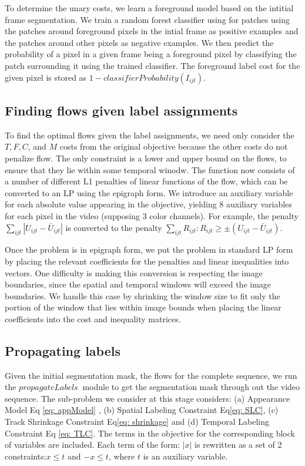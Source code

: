 To determine the unary costs, we learn a foreground model based on
the intitial frame segmentation. We train a random forest classifier
using for patches using the patches around foreground pixels in the
intial frame as positive examples and the patches around other pixels
as negative examples. We then predict the probability of a pixel in
a given frame being a foreground pixel by classifying the patch surrounding
it using the trained classifier. The foreground label cost for the
given pixel is stored as $1-classifierProbability(I_{ijt})$.


\subsection{Finding flows given label assignments}

To find the optimal flows given the label assignments, we need only consider the $T, F, C$, and $M$ costs from the original objective because the other costs do not penalize flow. The only constraint is a lower and upper bound on the flows, to ensure that they lie within some temporal winodw. The function now consists of a number of different L1 penalties of linear functions of the flow, which can be converted to an LP using the epigraph form. We introduce an auxiliary variable for each absolute value appearing in the objective, yielding 8 auxiliary variables for each pixel in the video (supposing 3 color channels). For example, the penalty $\sum_{i j t} |U_{i j t} - \bar{U}_{i j t} |$ is converted to the penalty $\sum_{i j t} R_{i j t} : R_{i j t} \geq \pm (U_{i j t} - \bar{U}_{i j t})$. 

Once the problem is in epigraph form, we put the problem in standard LP form by placing the relevant coefficients for the penalties and linear inequalities into vectors. One difficulty is making this conversion is respecting the image boundaries, since the spatial and temporal windows will exceed the image boundaries. We handle this case by shrinking the window size to fit only the portion of the window that lies within image bounds when placing the linear coefficients into the cost and inequality matrices.


\subsection{Propagating labels}
Given the initial segmentation mask, the flows for the complete sequence, we run the
$propagateLabels~$ module to get the segmentation mask through out the video 
sequence. 
The sub-problem we consider at this stage considers: (a) Appearance Model Eq
\eqref{eq: appModel} , (b) Spatial Labeling Constraint Eq\eqref{eq: SLC}, (c) Track 
Shrinkage Constraint Eq\eqref{eq: shrinkage} and (d) Temporal Labeling Constraint Eq
\eqref{eq: TLC}.
The terms in the objective for the corresponding block of variables are included. 
Each term of the form: $|x|$ is rewritten as a set of 2 constraints:$x \leq t$ and $-x \leq t$, where $t$ is an auxiliary variable. 

